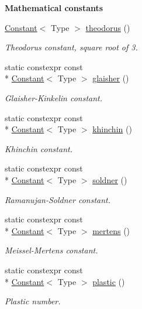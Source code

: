 \begin{Indent}{\bf Mathematical constants}
\begin{DoxyCompactItemize}
\hyperlink{exceptionmagrathea_1_1Constant}{Constant}$<$ Type $>$ \hyperlink{exceptionmagrathea_1_1Constants_ad3159d85d68d3971e3b189b2f8bf2a5d}{theodorus} ()
\begin{DoxyCompactList}\small\item\em Theodorus constant, square root of 3. \end{DoxyCompactList}\item 
static constexpr const \\*
\hyperlink{exceptionmagrathea_1_1Constant}{Constant}$<$ Type $>$ \hyperlink{exceptionmagrathea_1_1Constants_a663e56366d9e0901984ea37e320a02db}{glaisher} ()
\begin{DoxyCompactList}\small\item\em Glaisher-\/\-Kinkelin constant. \end{DoxyCompactList}\item 
static constexpr const \\*
\hyperlink{exceptionmagrathea_1_1Constant}{Constant}$<$ Type $>$ \hyperlink{exceptionmagrathea_1_1Constants_a5328879e70d67374d473978bdb9e6513}{khinchin} ()
\begin{DoxyCompactList}\small\item\em Khinchin constant. \end{DoxyCompactList}\item 
static constexpr const \\*
\hyperlink{exceptionmagrathea_1_1Constant}{Constant}$<$ Type $>$ \hyperlink{exceptionmagrathea_1_1Constants_a2bee4a8d239a5cec8e37d910b64e2edf}{soldner} ()
\begin{DoxyCompactList}\small\item\em Ramanujan-\/\-Soldner constant. \end{DoxyCompactList}\item 
static constexpr const \\*
\hyperlink{exceptionmagrathea_1_1Constant}{Constant}$<$ Type $>$ \hyperlink{exceptionmagrathea_1_1Constants_a0e26315ded308ccfa411ed1810a9793d}{mertens} ()
\begin{DoxyCompactList}\small\item\em Meissel-\/\-Mertens constant. \end{DoxyCompactList}\item 
static constexpr const \\*
\hyperlink{exceptionmagrathea_1_1Constant}{Constant}$<$ Type $>$ \hyperlink{exceptionmagrathea_1_1Constants_a0050af303614b166513b52a41f22b21a}{plastic} ()
\begin{DoxyCompactList}\small\item\em Plastic number. \end{DoxyCompactList}\item 

\end{DoxyCompactItemize}
\end{Indent}
